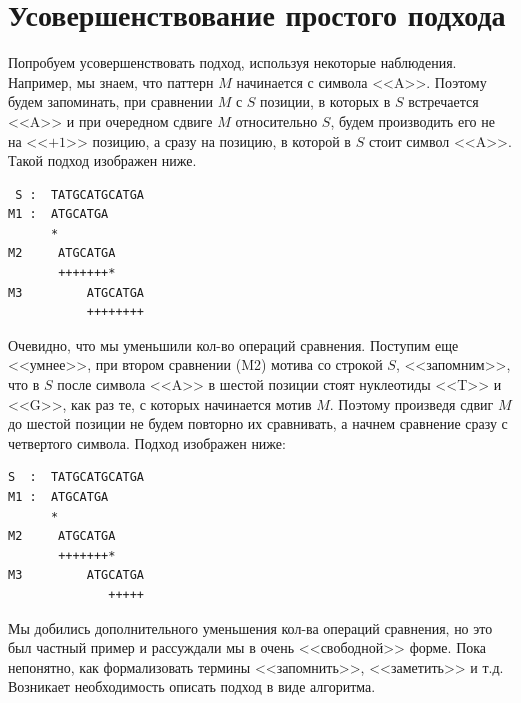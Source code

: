 \documentclass[letterpaper, 11pt]{article}
\begin{document}
\section{Усовершенствование простого подхода}
\par
Попробуем усовершенствовать подход, используя некоторые наблюдения. Например, мы знаем, что паттерн $M$ начинается с символа <<A>>. Поэтому будем запоминать, при сравнении $M$ с $S$ позиции, в которых в $S$ встречается <<A>> и при очередном сдвиге $M$ относительно $S$, будем производить его не на <<$+1$>> позицию, а сразу на позицию, в которой в $S$ стоит символ <<A>>. Такой подход изображен ниже.
\begin{verbatim}
 S :  TATGCATGCATGA
M1 :  ATGCATGA
      * 
M2     ATGCATGA
       +++++++*
M3         ATGCATGA
           ++++++++
\end{verbatim}
\par
Очевидно, что мы уменьшили кол-во операций сравнения. Поступим еще <<умнее>>, при втором сравнении (M2) мотива со строкой $S$, <<запомним>>, что в $S$ после символа <<A>> в шестой позиции стоят нуклеотиды <<T>> и <<G>>, как раз те, с которых начинается мотив $M$. Поэтому произведя сдвиг $M$ до шестой позиции не будем повторно их сравнивать, а начнем сравнение сразу с четвертого символа. Подход изображен ниже:
\begin{verbatim}
S  :  TATGCATGCATGA
M1 :  ATGCATGA
      * 
M2     ATGCATGA
       +++++++*
M3         ATGCATGA
              +++++
\end{verbatim}
\par
Мы добились дополнительного уменьшения кол-ва операций сравнения, но это был частный пример и рассуждали мы в очень <<свободной>> форме. Пока непонятно, как формализовать термины <<запомнить>>, <<заметить>> и т.д. Возникает необходимость описать подход в виде алгоритма.
\end{document}
